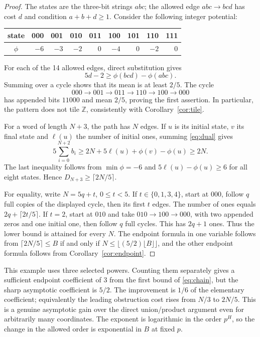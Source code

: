 \documentclass[11pt]{article}
\theoremstyle{definition}
\newcommand{\Z}{\mathbb Z}
\begin{document}
\begin{proof}
The states are the three-bit strings $abc$; the allowed edge $abc\to bcd$ has cost $d$ and condition $a+b+d\ge1$. Consider the following integer potential:
\begin{center}
\begin{tabular}{c|rrrrrrrr}
state&000&001&010&011&100&101&110&111\\ \midrule
$\phi$&$-6$&$-3$&$-2$&$0$&$-4$&$0$&$-2$&$0$
\end{tabular}
\end{center}
For each of the 14 allowed edges, direct substitution gives
\begin{equation}\label{eq:dual}
 5d-2\ge\phi(bcd)-\phi(abc).
\end{equation}
Summing over a cycle shows that its mean is at least $2/5$. The cycle
\[
 000\to001\to011\to110\to100\to000
\]
has appended bits $11000$ and mean $2/5$, proving the first assertion. In particular, the pattern does not tile $\Z$, consistently with Corollary~\ref{cor:tile}.

For a word of length $N+3$, the path has $N$ edges. If $u$ is its initial state, $v$ its final state and $\ell(u)$ the number of initial ones, summing \eqref{eq:dual} gives
\[
 5\sum_{i=0}^{N+2} b_i\ge 2N+5\ell(u)+\phi(v)-\phi(u)\ge2N.
\]
The last inequality follows from $\min\phi=-6$ and $5\ell(u)-\phi(u)\ge6$ for all eight states. Hence $D_{N+3}\ge\lceil2N/5\rceil$.

For equality, write $N=5q+t$, $0\le t<5$. If $t\in\{0,1,3,4\}$, start at $000$, follow $q$ full copies of the displayed cycle, then its first $t$ edges. The number of ones equals $2q+\lceil2t/5\rceil$. If $t=2$, start at $010$ and take $010\to100\to000$, with two appended zeros and one initial one, then follow $q$ full cycles. This has $2q+1$ ones. Thus the lower bound is attained for every $N$. The endpoint formula in one variable follows from $\lceil2N/5\rceil\le B$ if and only if $N\le\lfloor(5/2)\lfloor B\rfloor\rfloor$, and the other endpoint formula follows from Corollary~\ref{cor:endpoint}.
\end{proof}

This example uses three selected powers. Counting them separately gives a sufficient endpoint coefficient of $3$ from the first bound of \eqref{eq:chain}, but the sharp asymptotic coefficient is $5/2$. The improvement is $1/6$ of the elementary coefficient; equivalently the leading obstruction cost rises from $N/3$ to $2N/5$. This is a genuine asymptotic gain over the direct union/product argument even for arbitrarily many coordinates. The exponent is logarithmic in the order $p^H$, so the change in the allowed order is exponential in $B$ at fixed $p$.
\end{document}
